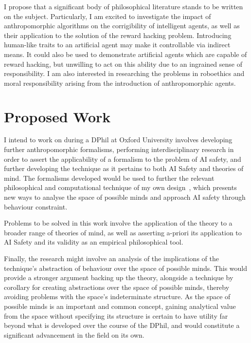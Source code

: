 I propose that a significant body of philosophical literature stands to be written on the subject. Particularly, I am excited to investigate the impact of anthropomorphic algorithms on the corrigibility of intelligent agents, as well as their application to the solution of the reward hacking problem. Introducing human-like traits to an artificial agent may make it controllable via indirect means. It could also be used to demonstrate artificial agents which are capable of reward hacking, but unwilling to act on this ability due to an ingrained sense of responsibility. I am also interested in researching the problems in roboethics and moral responsibility arising from the introduction of anthropomorphic agents.\par

\section{Proposed Work}
 I intend to work on during a DPhil at Oxford University involves developing further anthropomorphic formalisms, performing interdisciplinary research in order to assert the applicability of a formalism to the problem of AI safety, and further developing the technique as it pertains to both AI Safety and theories of mind. The formalisms developed would be used to further the relevant philosophical and computational technique of my own design~\cite{wallis_2016}, which presents new ways to analyse the space of possible minds and approach AI safety through behaviour constraint.\par

Problems to be solved in this work involve the application of the theory to a broader range of theories of mind, as well as asserting a-priori its application to AI Safety and its validity as an empirical philosophical tool.\par

Finally, the research might involve an analysis of the implications of the technique's abstraction of behaviour over the space of possible minds. This would provide a stronger argument backing up the theory, alongside a technique by corollary for creating abstractions over the space of possible minds, thereby avoiding problems with the space's indeterminate structure. As the space of possible minds is an important and common concept, gaining analytical value from the space without specifying its structure is certain to have utility far beyond what is developed over the course of the DPhil, and would constitute a significant advancement in the field on its own.\par

